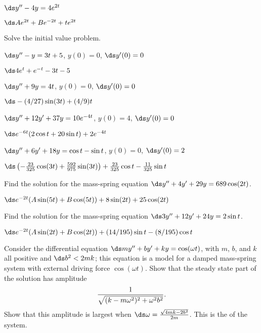 \begin{enumialphparenastyle}
\begin{ex}
 $\ds y''-4y=4e^{2t}$
\begin{sol}
 $\ds Ae^{2t}+Be^{-2t}+te^{2t}$
\end{sol}
\end{ex}


\noindent Solve the initial value problem.

\begin{ex}
 $\ds y''-y=3t+5$, $y(0)=0$, $\ds y'(0)=0$
\begin{sol}
 $\ds 4e^{t}+e^{-t}-3t-5$
\end{sol}
\end{ex}


\begin{ex}
 $\ds y''+9y=4t$, $y(0)=0$, $\ds y'(0)=0$
\begin{sol}
 $\ds -(4/27)\sin(3t)+(4/9)t$
\end{sol}
\end{ex}


\begin{ex}
 $\ds y'' +12y' +37y=10e^{-4t}$, $y(0)=4$, $\ds y'(0)=0$
\begin{sol}
 $\ds e^{-6t}(2\cos t+20\sin t)+2e^{-4t}$
\end{sol}
\end{ex}


\begin{ex}
 $\ds y''+6y'+18y=\cos t-\sin t$, $y(0)=0$, $\ds y'(0)=2$ 
\begin{sol}
 $\ds
\left(-{23\over 325}\cos(3t)+{592\over 975}\sin(3t)\right)+
{23\over325}\cos t-{11\over325}\sin t$
\end{sol}
\end{ex}


\begin{ex}
 Find the solution for the mass-spring equation
$\ds y''+4y'+29y=689\cos(2t)$.
\begin{sol}
 $\ds e^{-2t}(A\sin(5t)+B\cos(5t))+8\sin(2t)+25\cos(2t)$
\end{sol}
\end{ex}


\begin{ex}
 Find the solution for the mass-spring equation
$\ds3y''+12y'+24y=2\sin t$.
\begin{sol}
 $\ds e^{-2t}(A\sin(2t)+B\cos(2t))+(14/195)\sin t-(8/195)\cos t$
\end{sol}
\end{ex}


\begin{ex}
 Consider the differential 
equation $\ds my''+by'+ky=\cos(\omega t)$,
with $m$, $b$, and $k$ all positive and $\ds b^2<2mk$; this equation
is a model for a damped mass-spring system with external 
driving force $\cos(\omega t)$.
Show that the steady state part of the solution has amplitude
$${1\over \sqrt{(k-m\omega^2)^2+\omega^2b^2}}.$$
Show that this amplitude is largest when 
$\ds \omega={\sqrt{4mk-2b^2}\over 2m}$. This is the 
 of the system.
\end{ex}

\end{enumialphparenastyle}